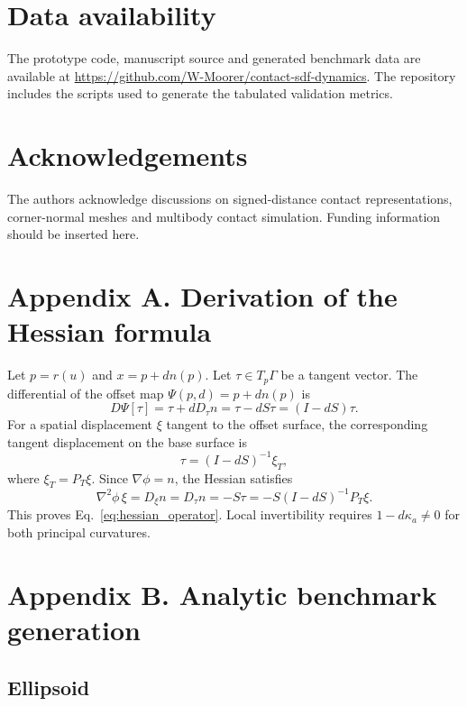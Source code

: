 \documentclass[preprint,12pt,sort&compress]{elsarticle}
\begin{document}
\section*{Data availability}
The prototype code, manuscript source and generated benchmark data are available at \url{https://github.com/W-Moorer/contact-sdf-dynamics}. The repository includes the scripts used to generate the tabulated validation metrics.

\section*{Acknowledgements}
The authors acknowledge discussions on signed-distance contact representations, corner-normal meshes and multibody contact simulation. Funding information should be inserted here.

\appendix

\section{Appendix A. Derivation of the Hessian formula}
\label{app:hessian}

Let $p=r(u)$ and $x=p+d n(p)$. Let $\tau\in T_p\Gamma$ be a tangent vector. The differential of the offset map $\Psi(p,d)=p+d n(p)$ is
\begin{equation}
 D\Psi[\tau] = \tau+dD_\tau n = \tau-dS\tau=(I-dS)\tau.
\end{equation}
For a spatial displacement $\xi$ tangent to the offset surface, the corresponding tangent displacement on the base surface is
\begin{equation}
 \tau=(I-dS)^{-1}\xi_T,
\end{equation}
where $\xi_T=P_T\xi$. Since $\nabla\phi=n$, the Hessian satisfies
\begin{equation}
 \nabla^2\phi\,\xi = D_\xi n = D_\tau n = -S\tau = -S(I-dS)^{-1}P_T\xi.
\end{equation}
This proves Eq.~\eqref{eq:hessian_operator}. Local invertibility requires $1-d\kappa_a\neq0$ for both principal curvatures.

\section{Appendix B. Analytic benchmark generation}
\label{app:benchmarks}

\subsection{Ellipsoid}
\end{document}
